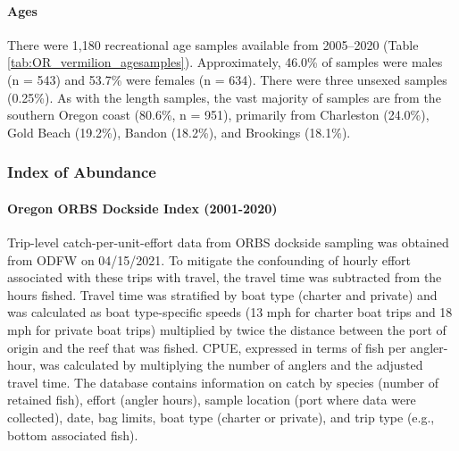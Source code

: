 \documentclass[11pt,
  english,
  a4paper,
]{article}
\begin{document}
\hypertarget{ages-1}{%
\paragraph{Ages}\label{ages-1}}

\leavevmode\tagmcend\tagstructend


There were 1,180 recreational age samples available from 2005--2020 (Table \ref{tab:OR_vermilion_agesamples}). Approximately, 46.0\% of samples were males (n = 543) and 53.7\% were females (n = 634). There were three unsexed samples (0.25\%). As with the length samples, the vast majority of samples are from the southern Oregon coast (80.6\%, n = 951), primarily from Charleston (24.0\%), Gold Beach (19.2\%), Bandon (18.2\%), and Brookings (18.1\%).

\leavevmode\tagmcend\tagstructend\par


\hypertarget{index-of-abundance}{%
\subsubsection{Index of Abundance}\label{index-of-abundance}}

\leavevmode\tagmcend\tagstructend


\hypertarget{oregon-orbs-dockside-index-2001-2020}{%
\paragraph{Oregon ORBS Dockside Index (2001-2020)}\label{oregon-orbs-dockside-index-2001-2020}}

\leavevmode\tagmcend\tagstructend


Trip-level catch-per-unit-effort data from ORBS dockside sampling was obtained from ODFW on 04/15/2021. To mitigate the confounding of hourly effort associated with these trips with travel, the travel time was subtracted from the hours fished. Travel time was stratified by boat type (charter and private) and was calculated as boat type-specific speeds (13 mph for charter boat trips and 18 mph for private boat trips) multiplied by twice the distance between the port of origin and the reef that was fished. CPUE, expressed in terms of fish per angler-hour, was calculated by multiplying the number of anglers and the adjusted travel time. The database contains information on catch by species (number of retained fish), effort (angler hours), sample location (port where data were collected), date, bag limits, boat type (charter or private), and trip type (e.g., bottom associated fish).
\end{document}
